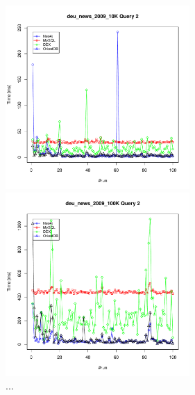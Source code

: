 \documentclass[11pt, a4paper, oneside]{article} %
\begin{document}
\begin{appendix}
\begin{figure}[ht]
\begin{minipage}[hbt]{7cm}
	\centering
	\includegraphics[width=7cm]{../results/cold caches/images/10K_query2_perf}
	\caption{...}
	\label{fig:10k_query2_perf}
\end{minipage}
\hfill
\begin{minipage}[hbt]{7cm}
	\centering
	\includegraphics[width=7cm]{../results/cold caches/images/100K_query2_perf}
	\caption{...}
	\label{fig:100k_query2_perf}
\end{minipage}


\end{figure}
\end{appendix}
\end{document}

